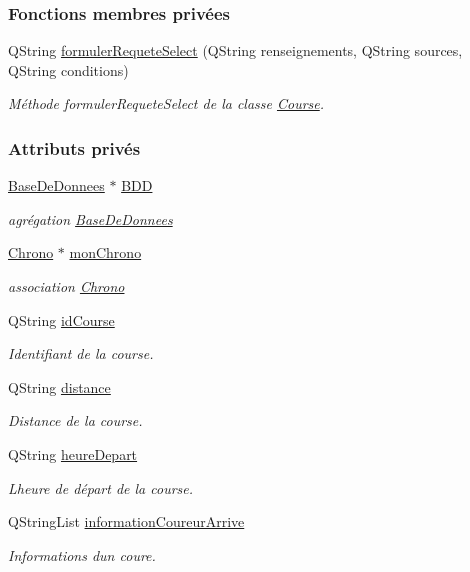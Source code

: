 \subsubsection*{Fonctions membres privées}
\begin{DoxyCompactItemize}
\item 
Q\+String \hyperlink{class_course_a2ce9c62ead2c878a30af9d9c11b81644}{formuler\+Requete\+Select} (Q\+String renseignements, Q\+String sources, Q\+String conditions)
\begin{DoxyCompactList}\small\item\em Méthode formuler\+Requete\+Select de la classe \hyperlink{class_course}{Course}. \end{DoxyCompactList}\end{DoxyCompactItemize}
\subsubsection*{Attributs privés}
\begin{DoxyCompactItemize}
\item 
\hyperlink{class_base_de_donnees}{Base\+De\+Donnees} $\ast$ \hyperlink{class_course_a28a58b06494361b7a7eb81844d571dd4}{B\+DD}
\begin{DoxyCompactList}\small\item\em agrégation \hyperlink{class_base_de_donnees}{Base\+De\+Donnees} \end{DoxyCompactList}\item 
\hyperlink{class_chrono}{Chrono} $\ast$ \hyperlink{class_course_a0c9b246b0f1ec612bd6e6c613a94d52b}{mon\+Chrono}
\begin{DoxyCompactList}\small\item\em association \hyperlink{class_chrono}{Chrono} \end{DoxyCompactList}\item 
Q\+String \hyperlink{class_course_a1f80798e50be6db9911a882a2491c698}{id\+Course}
\begin{DoxyCompactList}\small\item\em Identifiant de la course. \end{DoxyCompactList}\item 
Q\+String \hyperlink{class_course_af2f7b814a0ec0d76291a2743c61615a8}{distance}
\begin{DoxyCompactList}\small\item\em Distance de la course. \end{DoxyCompactList}\item 
Q\+String \hyperlink{class_course_aa2da10dd2fc8c1ca1d5831249181e61f}{heure\+Depart}
\begin{DoxyCompactList}\small\item\em L\textquotesingle{}heure de départ de la course. \end{DoxyCompactList}\item 
Q\+String\+List \hyperlink{class_course_a14838cc0c491a76baf7e5f12d8d08ab4}{information\+Coureur\+Arrive}
\begin{DoxyCompactList}\small\item\em Informations d\textquotesingle{}un coure. \end{DoxyCompactList}\end{DoxyCompactItemize}


